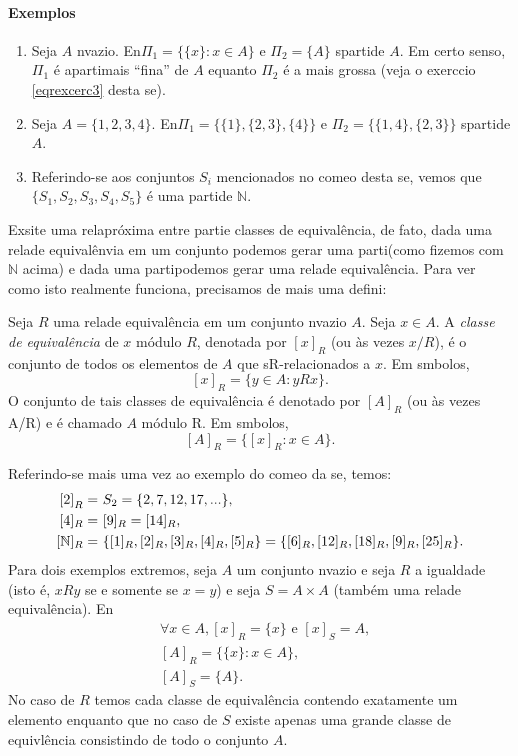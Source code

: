 \paragraph{{\bf Exemplos}}
\begin{enumerate}[{\bf 1.}]
\item\label{eqexe1} Seja $A$ n\ao vazio. En\tao $\Pi_1=\{\{x\}:x\in A\}$ e $\Pi_2=\{A\}$ s\ao parti\coes de $A$. Em certo senso, $\Pi_1$ \'e aparti\cao mais ``fina'' de $A$ equanto $\Pi_2$ \'e a mais grossa (veja o exerc\ih cio \ref{eqrexcerc3} desta se\caoi).
\item\label{eqexe2} Seja $A=\{1,2,3,4\}$. En\tao $\Pi_1=\{\{1\},\{2,3\},\{4\}\}$ e $\Pi_2=\{\{1,4\},\{2,3\}\}$ s\ao parti\cois de $A$.
\item\label{eqexe3} Referindo-se aos conjuntos $S_i$ mencionados no come\cc o desta se\caoi, vemos que $\{S_1,S_2,S_3,S_4,S_5\}$ \'e uma parti\cao de $\mathbb{N}$.
\end{enumerate}

Exsite uma rela\cao pr\'oxima entre parti\coes e classes de equival\^encia, de fato, dada uma rela\cao de equival\^envia em um conjunto podemos gerar uma parti\caoi (como fizemos com $\mathbb{N}$ acima) e dada uma parti\cao podemos gerar uma rela\cao de equival\^encia. Para ver como isto realmente funciona, precisamos de mais uma defini\caoi:
\begin{definb}
Seja $R$ uma rela\cao de equival\^encia em um conjunto n\ao vazio $A$. Seja $x\in A$. A {\it classe de equival\^encia} de $x$ m\'odulo $R$, denotada por $[x]_R$ (ou \`as vezes $x/R$), \'e o conjunto de todos os elementos de $A$ que s\ao R-relacionados a $x$. Em s\ih mbolos,
\[
[x]_R=\{y\in A: yRx\}.
\]
O conjunto de tais classes de equival\^encia \'e denotado por $[A]_R$ (ou \`as vezes A/R) e \'e chamado $A$ m\'odulo R. Em s\ih mbolos,
\[
[A]_R=\{[x]_R: x\in A\}.
\]
\end{definb}
Referindo-se mais uma vez ao exemplo do come\cc o da se\caoi, temos:
\begin{equation*}
 \begin{aligned}
{[2]}_R=&\textrm{ } S_2 = \{2,7,12,17,...\},\\
[4]_R=&\textrm{ } [9]_R = [14]_R,\\
[\mathbb{N}]_R=&\textrm{ } \{[1]_R,[2]_R,[3]_R,[4]_R,[5]_R\} = \{[6]_R,[12]_R,[18]_R,[9]_R,[25]_R\}.
 \end{aligned}
\end{equation*}
Para dois exemplos extremos, seja $A$ um conjunto n\ao vazio e seja $R$ a igualdade (isto \'e, $xRy$ se e somente se $x=y$) e seja $S=A\times A$ (tamb\'em uma rela\cao de equival\^encia). En\tao
\begin{equation*}
 \begin{aligned}
&\forall x\in A, [x]_R=\{x\} \textrm { e } [x]_S=A,\\
&[A]_R=\{\{x\}:x\in A\},\\
&[A]_S=\{A\}.
 \end{aligned}
\end{equation*}
No caso de $R$ temos cada classe de equival\^encia contendo exatamente um elemento enquanto que no caso de $S$ existe apenas uma grande classe de equivl\^encia consistindo de todo o conjunto $A$.

